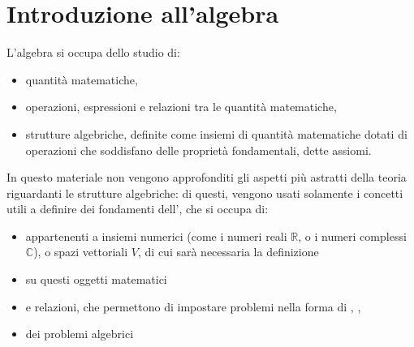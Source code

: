 \documentclass[letterpaper,10pt,english]{jupyterBook}
\begin{document}
\chapter{Introduzione all’algebra}
\label{\detokenize{ch/algebra:introduzione-all-algebra}}\label{\detokenize{ch/algebra:math-hs-algebra}}\label{\detokenize{ch/algebra::doc}}
\sphinxAtStartPar
L’algebra si occupa dello studio di:
\begin{itemize}
\item {} 
\sphinxAtStartPar
quantità matematiche,

\item {} 
\sphinxAtStartPar
operazioni, espressioni e relazioni tra le quantità matematiche,

\item {} 
\sphinxAtStartPar
strutture algebriche, definite come insiemi di quantità matematiche dotati di operazioni che soddisfano delle proprietà fondamentali, dette assiomi.

\end{itemize}

\sphinxAtStartPar
In questo materiale non vengono approfonditi gli aspetti più astratti della teoria riguardanti le strutture algebriche: di questi, vengono usati solamente i concetti utili a definire dei fondamenti dell’, che si occupa di:
\begin{itemize}
\item {} 
\sphinxAtStartPar
{} appartenenti a insiemi numerici (come i numeri reali \(\mathbb{R}\), o i numeri complessi \(\mathbb{C}\)), o spazi vettoriali \(V\), di cui sarà necessaria la definizione

\item {} 
\sphinxAtStartPar
{} su questi oggetti matematici

\item {} 
\sphinxAtStartPar
{} e relazioni, che permettono di impostare problemi nella forma di , , 

\item {} 
\sphinxAtStartPar
{} dei problemi algebrici

\end{itemize}

\sphinxstepscope
\end{document}
